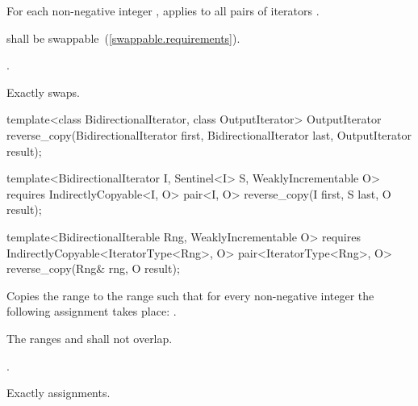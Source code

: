 \begin{itemdescr}
\pnum
\effects
For each non-negative integer
,
applies
to all pairs of iterators
.

\begin{removedblock}
\pnum
\requires
{} shall be swappable~(\ref{swappable.requirements}).
\end{removedblock}

\begin{addedblock}
\pnum
\returns {}.
\end{addedblock}

\pnum
\complexity
Exactly
swaps.
\end{itemdescr}

%
\begin{removedblock}
\begin{itemdecl}
template<class BidirectionalIterator, class OutputIterator>
  OutputIterator
    reverse_copy(BidirectionalIterator first,
                 BidirectionalIterator last, OutputIterator result);
\end{itemdecl}
\end{removedblock}
\begin{addedblock}
\begin{itemdecl}
template<BidirectionalIterator I, Sentinel<I> S, WeaklyIncrementable O>
  requires IndirectlyCopyable<I, O>
  pair<I, O> reverse_copy(I first, S last, O result);

template<BidirectionalIterable Rng, WeaklyIncrementable O>
  requires IndirectlyCopyable<IteratorType<Rng>, O>
  pair<IteratorType<Rng>, O>
    reverse_copy(Rng& rng, O result);
\end{itemdecl}
\end{addedblock}

\begin{itemdescr}
\pnum
\effects
Copies the range
to the range
such that
for every non-negative integer
the following assignment takes place:
.

\pnum
\requires
The ranges
and
shall not overlap.

\pnum
\returns
{}.

\pnum
\complexity
Exactly
assignments.
\end{itemdescr}

